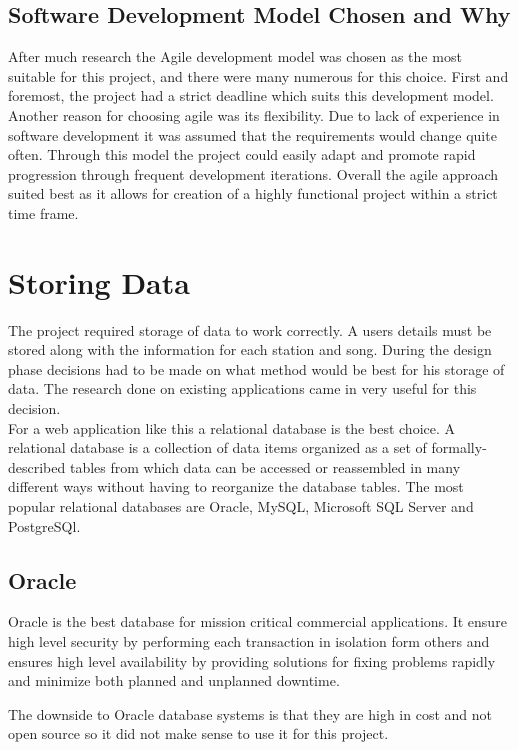 \documentclass[a4paper, 12pt]{report}
\begin{document}
\subsection{Software Development Model Chosen and Why}
After much research the Agile development model was chosen as the most suitable for this project, and there were many numerous for this choice. First and foremost, the project had a strict deadline which suits this development model. Another reason for choosing agile was its flexibility. Due to lack of experience in software development it was assumed that the requirements would change quite often. Through this model the project could easily adapt and promote rapid progression through frequent development iterations. 
Overall the agile approach suited best as it allows for creation of a highly functional project within a strict time frame.  

\section{Storing Data}
The project required storage of data to work correctly. A users details must be stored along with the information for each station and song. During the design phase decisions had to be made on what method would be best for his storage of data. The research done on existing applications came in very useful for this decision. \\

For a web application like this a relational database is the best choice. A relational database is a collection of data items organized as a set of formally-described tables from which data can be accessed or reassembled in many different ways without having to reorganize the database tables\cite{RDSM}. The most popular relational databases are Oracle, MySQL, Microsoft SQL Server and PostgreSQl. 

\subsection{Oracle}
Oracle is the best database for mission critical commercial applications. It ensure high level security by performing each transaction in isolation form others and ensures high level availability by providing solutions for fixing problems rapidly and minimize both planned and unplanned downtime. 

The downside to Oracle database systems is that they are high in cost and not open source so it did not make sense to use it for this project\cite{oracle}.
\end{document}
